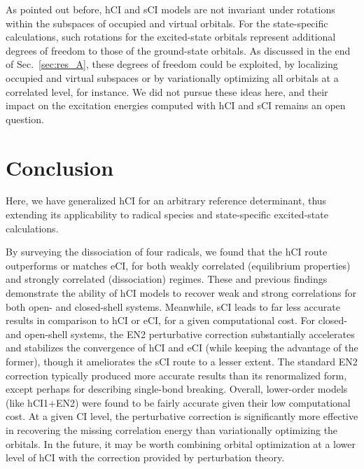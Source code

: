 \documentclass[aip,jcp,reprint,noshowkeys,superscriptaddress]{revtex4-1}
\begin{document}
As pointed out before, hCI and sCI models are not invariant under rotations within the subspaces of occupied and virtual orbitals.
For the state-specific calculations, such rotations for the excited-state orbitals represent additional degrees of freedom to those of the ground-state orbitals. \cite{Kossoski_2022}
As discussed in the end of Sec.~\ref{sec:res_A}, these degrees of freedom could be exploited,
by localizing occupied and virtual subspaces or by variationally optimizing all orbitals at a correlated level, for instance.
We did not pursue these ideas here, and their impact on the excitation energies computed with hCI and sCI remains an open question.

\section{Conclusion}
\label{sec:conclusion}

Here, we have generalized hCI \cite{Kossoski_2022} for an arbitrary reference determinant, thus extending its applicability to radical species and state-specific excited-state calculations.

By surveying the dissociation of four radicals,
we found that the hCI route outperforms or matches eCI, for both weakly correlated (equilibrium properties) and strongly correlated (dissociation) regimes.
These and previous \cite{Kossoski_2022} findings demonstrate the ability of hCI models to recover weak and strong correlations for both open- and closed-shell systems.
Meanwhile, sCI leads to far less accurate results in comparison to hCI or eCI, for a given computational cost.
For closed- and open-shell systems, the EN2 perturbative correction
substantially accelerates and stabilizes the convergence of hCI and eCI (while keeping the advantage of the former),
though it ameliorates the sCI route to a lesser extent.
The standard EN2 correction typically produced more accurate results than its renormalized form, except perhaps for describing single-bond breaking.
Overall, lower-order models (like hCI1+EN2) were found to be fairly accurate given their low computational cost.
At a given CI level, the perturbative correction is significantly more effective in recovering the missing correlation energy than variationally optimizing the orbitals. \cite{Kossoski_2022}
In the future, it may be worth combining orbital optimization at a lower level of hCI \cite{Kossoski_2022} with the correction provided by perturbation theory.
\end{document}
